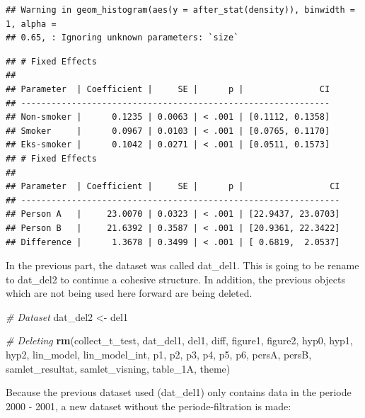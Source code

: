 \documentclass[
]{article}
\newenvironment{Shaded}{\begin{snugshade}}{\end{snugshade}}
\newcommand{\CommentTok}[1]{\textcolor[rgb]{0.56,0.35,0.01}{\textit{#1}}}
\newcommand{\FunctionTok}[1]{\textcolor[rgb]{0.13,0.29,0.53}{\textbf{#1}}}
\newcommand{\NormalTok}[1]{#1}
\newcommand{\OtherTok}[1]{\textcolor[rgb]{0.56,0.35,0.01}{#1}}
\begin{document}
\begin{verbatim}
## Warning in geom_histogram(aes(y = after_stat(density)), binwidth = 1, alpha =
## 0.65, : Ignoring unknown parameters: `size`
\end{verbatim}

\begin{verbatim}
## # Fixed Effects
## 
## Parameter  | Coefficient |     SE |      p |               CI
## -------------------------------------------------------------
## Non-smoker |      0.1235 | 0.0063 | < .001 | [0.1112, 0.1358]
## Smoker     |      0.0967 | 0.0103 | < .001 | [0.0765, 0.1170]
## Eks-smoker |      0.1042 | 0.0271 | < .001 | [0.0511, 0.1573]
## # Fixed Effects
## 
## Parameter  | Coefficient |     SE |      p |                 CI
## ---------------------------------------------------------------
## Person A   |     23.0070 | 0.0323 | < .001 | [22.9437, 23.0703]
## Person B   |     21.6392 | 0.3587 | < .001 | [20.9361, 22.3422]
## Difference |      1.3678 | 0.3499 | < .001 | [ 0.6819,  2.0537]
\end{verbatim}

In the previous part, the dataset was called dat\_del1. This is going to
be rename to dat\_del2 to continue a cohesive structure. In addition,
the previous objects which are not being used here forward are being
deleted.

\begin{Shaded}
\begin{Highlighting}[]
\CommentTok{\# Dataset}
\NormalTok{dat\_del2 }\OtherTok{\textless{}{-}}\NormalTok{ del1}

\CommentTok{\# Deleting }
\FunctionTok{rm}\NormalTok{(collect\_t\_test, dat\_del1, del1, diff, figure1, figure2, hyp0, hyp1, hyp2, lin\_model, lin\_model\_int, p1, p2, p3, p4, p5, p6, persA, persB, samlet\_resultat, samlet\_visning, table\_1A, theme)}
\end{Highlighting}
\end{Shaded}

Because the previous dataset used (dat\_del1) only contains data in the
periode 2000 - 2001, a new dataset without the periode-filtration is
made:
\end{document}
